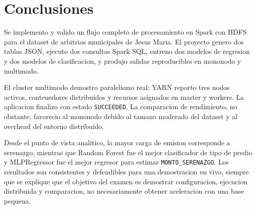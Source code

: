 \section{Conclusiones}

Se implemento y valido un flujo completo de procesamiento en Spark con HDFS para el dataset de arbitrios municipales de Jesus Maria. El proyecto genero dos tablas JSON, ejecuto dos consultas Spark SQL, entreno dos modelos de regresion y dos modelos de clasificacion, y produjo salidas reproducibles en mononodo y multimodo.

El cluster multimodo demostro paralelismo real: YARN reporto tres nodos activos, contenedores distribuidos y recursos asignados en master y workers. La aplicacion finalizo con estado \texttt{SUCCEEDED}. La comparacion de rendimiento, no obstante, favorecio al mononodo debido al tamano moderado del dataset y al overhead del entorno distribuido.

Desde el punto de vista analitico, la mayor carga de emision corresponde a serenazgo, mientras que Random Forest fue el mejor clasificador de tipo de predio y MLPRegressor fue el mejor regresor para estimar \texttt{MONTO\_SERENAZGO}. Los resultados son consistentes y defendibles para una demostracion en vivo, siempre que se explique que el objetivo del examen es demostrar configuracion, ejecucion distribuida y comparacion, no necesariamente obtener aceleracion con una base pequena.
